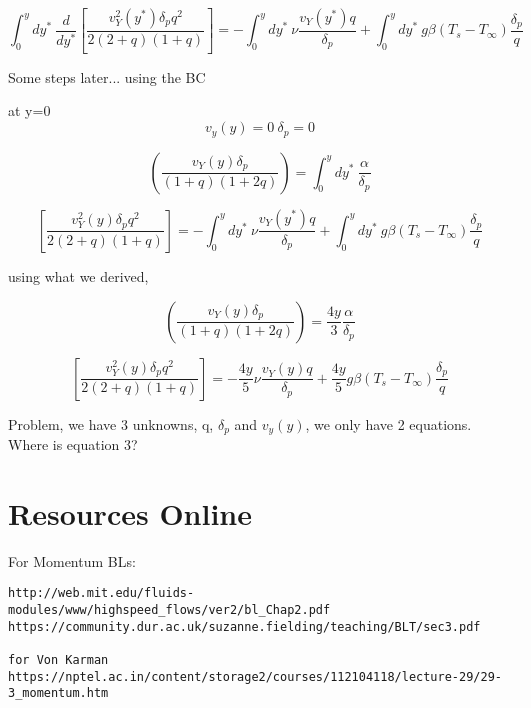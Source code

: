 \documentclass[11pt]{article}
\begin{document}
$$\int_0^y dy^* \ \frac{d}{dy^*} \left[  \frac{v_Y^2 (y^*) \delta_p q^2  }{2(2+q)(1+ q)} \right] = -\int_0^y dy^* \  \nu  \frac{ v_Y (y^*) q}{\delta_p} + \int_0^y dy^* \  g\beta  (T_s -T_\infty) \frac{\delta_p}{q}$$

Some steps later... using the BC

at y=0
$$v_y(y)=0  \ \delta_p = 0$$

$$   ( \frac{ v_Y (y) \delta_p}{(1 + q)(1+2q)}  ) =  \int_0^y dy^* \ \frac{\alpha}{\delta_p}$$


$$\left[  \frac{v_Y^2 (y) \delta_p q^2  }{2(2+q)(1+ q)} \right] = -\int_0^y dy^* \  \nu  \frac{ v_Y (y^*) q}{\delta_p} + \int_0^y dy^* \  g\beta  (T_s -T_\infty) \frac{\delta_p}{q}$$

using what we derived,

$$   ( \frac{ v_Y (y) \delta_p}{(1 + q)(1+2q)}  ) = \frac{4y}{3} \frac{\alpha}{\delta_p}$$


$$\left[  \frac{v_Y^2 (y) \delta_p q^2  }{2(2+q)(1+ q)} \right] = -\frac{4y}{5} \nu  \frac{ v_Y (y) q}{\delta_p} + \frac{4y}{5}  g\beta  (T_s -T_\infty) \frac{\delta_p}{q}$$

Problem, we have 3 unknowns, q, $\delta_p$ and $v_y(y)$, we only have 2 equations. Where is equation 3?


%
%
%
%
%
%
%
%
%
%
%
%


\part{Resources Online}

For Momentum BLs:
\begin{verbatim}
http://web.mit.edu/fluids-modules/www/highspeed_flows/ver2/bl_Chap2.pdf
https://community.dur.ac.uk/suzanne.fielding/teaching/BLT/sec3.pdf

for Von Karman
https://nptel.ac.in/content/storage2/courses/112104118/lecture-29/29-3_momentum.htm
\end{verbatim}
\end{document}
